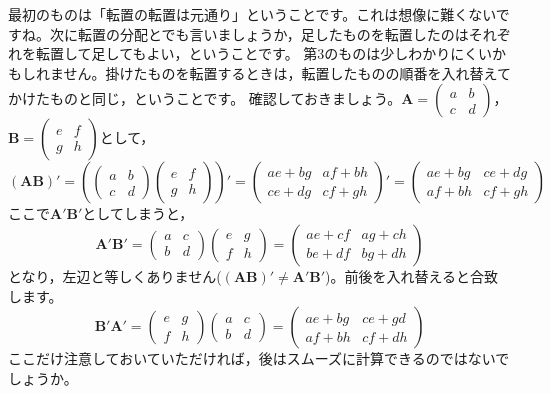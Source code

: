 \documentclass{ltjsbook}
\begin{document}
最初のものは「転置の転置は元通り」ということです。これは想像に難くないですね。次に転置の分配とでも言いましょうか，足したものを転置したのはそれぞれを転置して足してもよい，ということです。
第3のものは少しわかりにくいかもしれません。掛けたものを転置するときは，転置したものの順番を入れ替えてかけたものと同じ，ということです。
確認しておきましょう。$\bm{A} = \begin{pmatrix} a& b\\ c &d \end{pmatrix}$，$\bm{B} = \begin{pmatrix} e & f \\ g & h \end{pmatrix}$として，
\[
	(\bm{A} \bm{B})' =
	\left( \begin{pmatrix} a& b \\ c & d \end{pmatrix} \begin{pmatrix} e & f \\ g & h \end{pmatrix} \right )' =
	\begin{pmatrix} ae+bg & af+bh \\ ce+dg & cf + gh \end{pmatrix}' =
	\begin{pmatrix} ae+bg & ce+dg \\ af+bh & cf+gh \end{pmatrix}
\]
ここで$\bm{A}'\bm{B}'$としてしまうと，
\[
	\bm{A}' \bm{B}' =
	\begin{pmatrix} a & c \\ b &d \end{pmatrix} \begin{pmatrix} e & g \\ f & h \end{pmatrix} =
	\begin{pmatrix} ae+cf & ag+ch \\ be+df & bg+dh \end{pmatrix}
\]
となり，左辺と等しくありません($(\bm{AB})'\neq \bm{A}'\bm{B}'$)。前後を入れ替えると合致します。
\[
	\bm{B}' \bm{A}' =
	\begin{pmatrix} e & g \\ f & h \end{pmatrix} \begin{pmatrix} a & c \\ b & d \end{pmatrix} =
	\begin{pmatrix} ae+bg & ce+gd \\ af+bh & cf + dh \end{pmatrix}
\]
ここだけ注意しておいていただければ，後はスムーズに計算できるのではないでしょうか。
\end{document}
